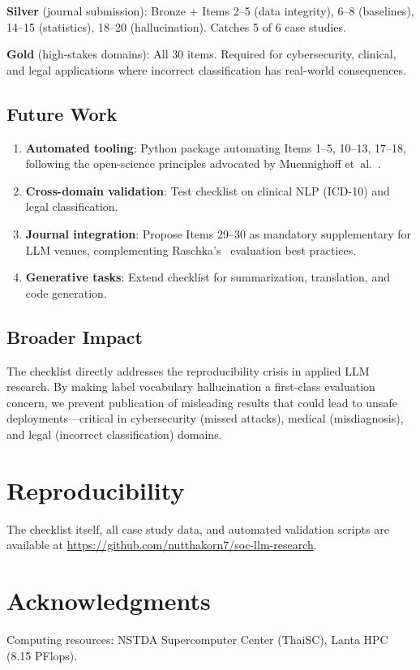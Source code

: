 \documentclass[review,3p]{elsarticle}
\begin{document}
\textbf{Silver} (journal submission): Bronze + Items 2--5 (data integrity), 6--8 (baselines), 14--15 (statistics), 18--20 (hallucination). Catches 5 of 6 case studies.

\textbf{Gold} (high-stakes domains): All 30 items. Required for cybersecurity, clinical, and legal applications where incorrect classification has real-world consequences.

\subsection{Future Work}
\begin{enumerate}
\item \textbf{Automated tooling}: Python package automating Items 1--5, 10--13, 17--18, following the open-science principles advocated by Muennighoff et~al.~\cite{muennighoff2024}.
\item \textbf{Cross-domain validation}: Test checklist on clinical NLP (ICD-10) and legal classification.
\item \textbf{Journal integration}: Propose Items 29--30 as mandatory supplementary for LLM venues, complementing Raschka's~\cite{raschka2024} evaluation best practices.
\item \textbf{Generative tasks}: Extend checklist for summarization, translation, and code generation.
\end{enumerate}

\subsection{Broader Impact}
The checklist directly addresses the reproducibility crisis in applied LLM research. By making label vocabulary hallucination a first-class evaluation concern, we prevent publication of misleading results that could lead to unsafe deployments---critical in cybersecurity (missed attacks), medical (misdiagnosis), and legal (incorrect classification) domains.

\section*{Reproducibility}
The checklist itself, all case study data, and automated validation scripts are available at \url{https://github.com/nutthakorn7/soc-llm-research}.

\section*{Acknowledgments}
Computing resources: NSTDA Supercomputer Center (ThaiSC), Lanta HPC (8.15 PFlops).
\end{document}
